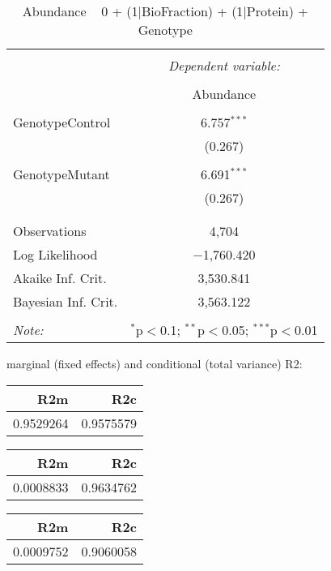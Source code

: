 \documentclass[11pt]{report}
\begin{document}
\begin{table}[!htbp] \centering 
  \caption{Abundance ~ 0 + (1|BioFraction) + (1|Protein) + Genotype} 
  \label{} 
\begin{tabular}{@{\extracolsep{5pt}}lc} 
\\[-1.8ex]\hline 
\hline \\[-1.8ex] 
 & \multicolumn{1}{c}{\textit{Dependent variable:}} \\ 
\cline{2-2} 
\\[-1.8ex] & Abundance \\ 
\hline \\[-1.8ex] 
 GenotypeControl & 6.757$^{***}$ \\ 
  & (0.267) \\ 
  & \\ 
 GenotypeMutant & 6.691$^{***}$ \\ 
  & (0.267) \\ 
  & \\ 
\hline \\[-1.8ex] 
Observations & 4,704 \\ 
Log Likelihood & $-$1,760.420 \\ 
Akaike Inf. Crit. & 3,530.841 \\ 
Bayesian Inf. Crit. & 3,563.122 \\ 
\hline 
\hline \\[-1.8ex] 
\textit{Note:}  & \multicolumn{1}{r}{$^{*}$p$<$0.1; $^{**}$p$<$0.05; $^{***}$p$<$0.01} \\ 
\end{tabular} 
\end{table} 
marginal (fixed effects) and conditional (total variance) R2:

\begin{tabular}{r|r}
\hline
R2m & R2c\\
\hline
0.9529264 & 0.9575579\\
\hline
\end{tabular}

\begin{tabular}{r|r}
\hline
R2m & R2c\\
\hline
0.0008833 & 0.9634762\\
\hline
\end{tabular}

\begin{tabular}{r|r}
\hline
R2m & R2c\\
\hline
0.0009752 & 0.9060058\\
\hline
\end{tabular}
\end{document}
